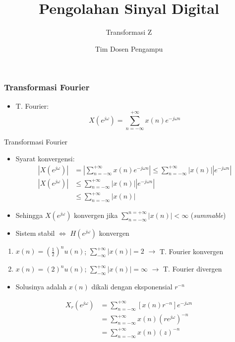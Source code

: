 \documentclass[pdflatex,compress,mathserif]{beamer}
\title{Pengolahan Sinyal Digital}
\subtitle{Transformasi Z}
\author{Tim Dosen Pengampu}
\begin{document}
\maketitle

\begin{frame}
	\frametitle{Transformasi Fourier}
	\begin{itemize}
		\item T. Fourier:
		\[ X(e^{j \omega}) = \sum_{n = -\infty}^{+ \infty} x(n) e^{-j\omega n} \]
	\end{itemize}
\end{frame}

\begin{frame}{Transformasi Fourier}
	\begin{itemize}
		\item Syarat konvergensi:
		\begin{align*}
		| X(e^{j \omega}) | &= \left| \sum_{n = -\infty}^{+ \infty} x(n) e^{-j\omega n} \right| \leq \sum_{n = -\infty}^{+ \infty} | x(n) | | e^{-j\omega n} | \\
		| X(e^{j \omega}) | &\leq \sum_{n = -\infty}^{+ \infty} | x(n) | | e^{-j\omega n} | \\
		&\leq \sum_{n = -\infty}^{+ \infty} | x(n) |
		\end{align*}
		\item Sehingga $ X(e^{j \omega}) $ konvergen jika $ \sum\limits_{n = -\infty}^{n = +\infty} | x(n) |< \infty $ (\textit{summable})
		\item Sistem stabil $\Leftrightarrow$ $ H(e^{j \omega}) $ konvergen
	\end{itemize}
\end{frame}

\begin{frame}
	\begin{enumerate}
		\item $ x(n) = (\frac{1}{2})^n u(n) $; $ \sum\limits_{-\infty}^{+\infty} |x(n)| = 2 $ $\rightarrow$ T. Fourier konvergen
		\item $ x(n) = (2)^n u(n) $; $ \sum\limits_{-\infty}^{+\infty} |x(n)| = \infty $ $\rightarrow$ T. Fourier divergen
	\end{enumerate}
\end{frame}

\begin{frame}
	\begin{itemize}
		\item Solusinya adalah $ x(n) $ dikali dengan eksponensial $ r^{-n} $
	\end{itemize}
	\begin{align*}
		X_r(e^{j \omega}) &= \sum\limits_{n = -\infty}^{+\infty} [ x(n) r^{-n} ]e^{-j \omega n} \\
		&= \sum\limits_{n = -\infty}^{+\infty} x(n)(re^{j \omega })^{-n} \\
		&= \sum\limits_{n = -\infty}^{+\infty} x(n)(z)^{-n}
	\end{align*}
\end{frame}
\end{document}

